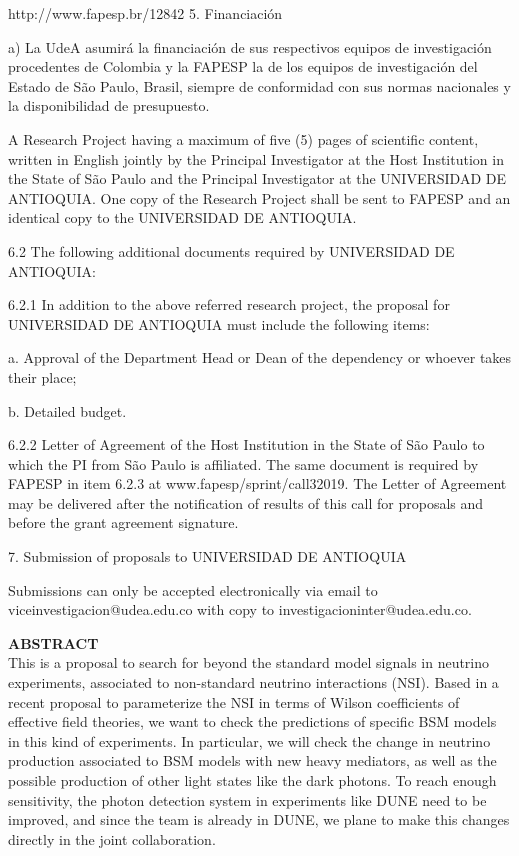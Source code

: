 \documentclass[a4paper,10pt,epsfig,epsf,amsfonts,amsmath]{article}
\begin{document}
\begin{udea}
  http://www.fapesp.br/12842
  5. Financiación

a) La UdeA asumirá la financiación de sus respectivos equipos de investigación procedentes de Colombia y la FAPESP la de los equipos de investigación del Estado de São Paulo, Brasil, siempre de conformidad con sus normas nacionales y la disponibilidad de presupuesto.
\end{udea}
\begin{instructions}
A Research Project having a maximum of five (5) pages of scientific content, written in English jointly by the Principal Investigator at the Host Institution in the State of São Paulo and the Principal Investigator at the UNIVERSIDAD DE ANTIOQUIA. One copy of the Research Project shall be sent to FAPESP and an identical copy to the UNIVERSIDAD DE ANTIOQUIA.
\end{instructions}
\begin{udea}
  6.2 The following additional documents required by UNIVERSIDAD DE ANTIOQUIA:

6.2.1 In addition to the above referred research project, the proposal for UNIVERSIDAD DE ANTIOQUIA must include the following items:

a. Approval of the Department Head or Dean of the dependency or whoever takes their place;

b. Detailed budget.

6.2.2 Letter of Agreement of the Host Institution in the State of São Paulo to which the PI from São Paulo is affiliated. The same document is required by FAPESP in item 6.2.3 at www.fapesp/sprint/call32019. The Letter of Agreement may be delivered after the notification of results of this call for proposals and before the grant agreement signature.

7. Submission of proposals to UNIVERSIDAD DE ANTIOQUIA

Submissions can only be accepted electronically via email to viceinvestigacion@udea.edu.co with copy to investigacioninter@udea.edu.co.
\end{udea}

\newpage

 
{\bf ABSTRACT}\\
This is a proposal to search for beyond the standard model signals in neutrino experiments, 
associated to non-standard neutrino interactions (NSI).
Based in a recent proposal to parameterize the NSI in terms of Wilson coefficients of effective field theories, 
we want to check the predictions of specific BSM models in this kind of experiments. In particular, we 
will check the change in neutrino production associated to BSM models with new heavy mediators, as well as the possible
production of other light states like the dark photons. 
To reach enough sensitivity, the photon detection system in experiments like DUNE need to be improved, and since the team is already in DUNE, we plane to 
make this changes directly in the joint collaboration.
\end{document}
